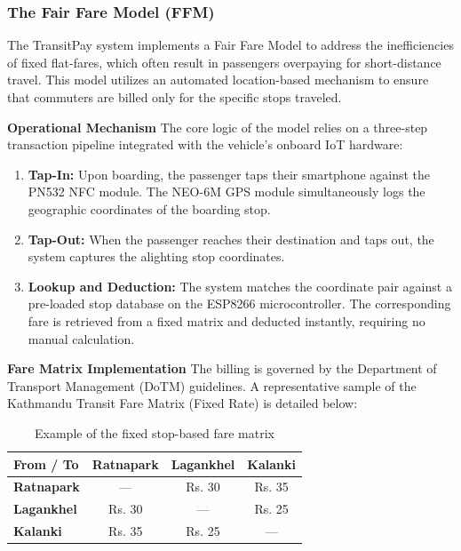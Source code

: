 \documentclass[sigconf, nonacm]{acmart}
\begin{document}
\subsubsection{The Fair Fare Model (FFM)}

The TransitPay system implements a Fair Fare Model to address the inefficiencies of fixed flat-fares, which often result in passengers overpaying for short-distance travel. This model utilizes an automated location-based mechanism to ensure that commuters are billed only for the specific stops traveled.

\textbf{Operational Mechanism}
The core logic of the model relies on a three-step transaction pipeline integrated with the vehicle's onboard IoT hardware:

\begin{enumerate}
    \item \textbf{Tap-In:} Upon boarding, the passenger taps their smartphone against the PN532 NFC module. The NEO-6M GPS module simultaneously logs the geographic coordinates of the boarding stop.
    \item \textbf{Tap-Out:} When the passenger reaches their destination and taps out, the system captures the alighting stop coordinates.
    \item \textbf{Lookup and Deduction:} The system matches the coordinate pair against a pre-loaded stop database on the ESP8266 microcontroller. The corresponding fare is retrieved from a fixed matrix and deducted instantly, requiring no manual calculation.
\end{enumerate}

\textbf{Fare Matrix Implementation}
The billing is governed by the Department of Transport Management (DoTM) guidelines. A representative sample of the Kathmandu Transit Fare Matrix (Fixed Rate) is detailed below:

\begin{table}[H]
  \centering
  \caption{Example of the fixed stop-based fare matrix}
  \label{tab:fare_matrix}
  \begin{tabular}{lccc}
    \toprule
    \textbf{From / To} & \textbf{Ratnapark} & \textbf{Lagankhel} & \textbf{Kalanki}\\
    \midrule
    \textbf{Ratnapark} & — & Rs. 30 & Rs. 35 \\
    \textbf{Lagankhel} & Rs. 30 & — & Rs. 25 \\
    \textbf{Kalanki}   & Rs. 35 & Rs. 25 & — \\
    \bottomrule
   \end{tabular}
\end{table}
\end{document}
